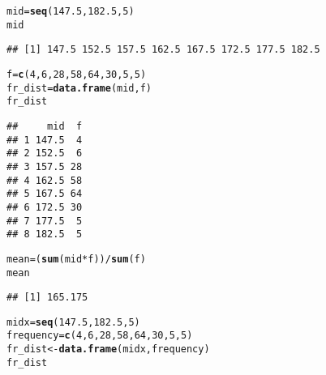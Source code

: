 \documentclass{article}\usepackage[]{graphicx}\usepackage[]{xcolor}
\makeatletter
\newcommand{\hlnum}[1]{\textcolor[rgb]{0.686,0.059,0.569}{#1}}%
\newcommand{\hlopt}[1]{\textcolor[rgb]{0,0,0}{#1}}%
\newcommand{\hldef}[1]{\textcolor[rgb]{0.345,0.345,0.345}{#1}}%
\newcommand{\hlkwb}[1]{\textcolor[rgb]{0.69,0.353,0.396}{#1}}%
\newcommand{\hlkwd}[1]{\textcolor[rgb]{0.737,0.353,0.396}{\textbf{#1}}}%
\newenvironment{kframe}{%
 \def\at@end@of@kframe{}%
 \ifinner\ifhmode%
  \def\at@end@of@kframe{\end{minipage}}%
  \begin{minipage}{\columnwidth}%
 \fi\fi%
 \def\FrameCommand##1{\hskip\@totalleftmargin \hskip-\fboxsep
 \colorbox{shadecolor}{##1}\hskip-\fboxsep
     \hskip-\linewidth \hskip-\@totalleftmargin \hskip\columnwidth}%
 \MakeFramed {\advance\hsize-\width
   \@totalleftmargin\z@ \linewidth\hsize
   \@setminipage}}%
 {\par\unskip\endMakeFramed%
 \at@end@of@kframe}
\newenvironment{knitrout}{}{} %
\makeatother
\begin{document}
\begin{table}[h]
    \centering
\end{table}
\begin{knitrout}
\color{fgcolor}\begin{kframe}
\begin{alltt}
\hldef{mid}\hlkwb{=}\hlkwd{seq}\hldef{(}\hlnum{147.5}\hldef{,}\hlnum{182.5}\hldef{,}\hlnum{5}\hldef{)}
\hldef{mid}
\end{alltt}
\begin{verbatim}
## [1] 147.5 152.5 157.5 162.5 167.5 172.5 177.5 182.5
\end{verbatim}
\begin{alltt}
\hldef{f}\hlkwb{=}\hlkwd{c}\hldef{(}\hlnum{4}\hldef{,}\hlnum{6}\hldef{,}\hlnum{28}\hldef{,}\hlnum{58}\hldef{,}\hlnum{64}\hldef{,}\hlnum{30}\hldef{,}\hlnum{5}\hldef{,}\hlnum{5}\hldef{)}
\hldef{fr_dist}\hlkwb{=}\hlkwd{data.frame}\hldef{(mid,f)}
\hldef{fr_dist}
\end{alltt}
\begin{verbatim}
##     mid  f
## 1 147.5  4
## 2 152.5  6
## 3 157.5 28
## 4 162.5 58
## 5 167.5 64
## 6 172.5 30
## 7 177.5  5
## 8 182.5  5
\end{verbatim}
\begin{alltt}
\hldef{mean}\hlkwb{=}\hldef{(}\hlkwd{sum}\hldef{(mid}\hlopt{*}\hldef{f))}\hlopt{/}\hlkwd{sum}\hldef{(f)}
\hldef{mean}
\end{alltt}
\begin{verbatim}
## [1] 165.175
\end{verbatim}
\begin{alltt}
\hldef{midx}\hlkwb{=}\hlkwd{seq}\hldef{(}\hlnum{147.5}\hldef{,}\hlnum{182.5}\hldef{,}\hlnum{5}\hldef{)}
\hldef{frequency}\hlkwb{=}\hlkwd{c}\hldef{(}\hlnum{4}\hldef{,}\hlnum{6}\hldef{,}\hlnum{28}\hldef{,}\hlnum{58}\hldef{,}\hlnum{64}\hldef{,}\hlnum{30}\hldef{,}\hlnum{5}\hldef{,}\hlnum{5}\hldef{)}
\hldef{fr_dist}\hlkwb{<-}\hlkwd{data.frame}\hldef{(midx,frequency)}
\hldef{fr_dist}
\end{alltt}
\begin{verbatim}

\end{verbatim}
\end{kframe}
\end{knitrout}
\end{document}
